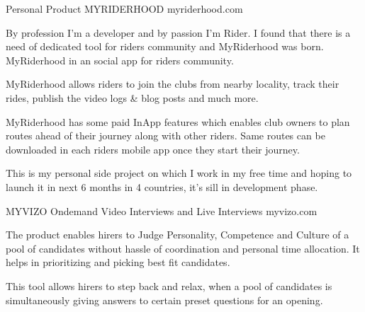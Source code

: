 

\begin{cventries}

  \cventry
    {Personal Product} %
    {MYRIDERHOOD} %
    {myriderhood.com} %
    { } %
    {
      \begin{cvitems} %
        \item {By profession I'm a developer and by passion I'm Rider. I found that there is a need of dedicated tool for riders community and MyRiderhood was born. MyRiderhood in an social app for riders community.}
	 \item {MyRiderhood allows riders to join the clubs from nearby locality, track their rides, publish the video logs \& blog posts and much more. }
	  \item {MyRiderhood has some paid InApp features which enables club owners to plan routes ahead of their journey along with other riders. Same routes can be downloaded in each riders mobile app once they start their journey.}
	   \item {This is my personal side project on which I work in my free time and hoping to launch it in next 6 months in 4 countries, it's sill in development phase. }
        \\
      \end{cvitems}
    }
  \cventry
    {MYVIZO} %
    {Ondemand Video Interviews and Live Interviews} %
    {myvizo.com} %
    { } %
    {
      \begin{cvitems} %
        \item {The product enables hirers to Judge Personality, Competence and Culture of a pool of candidates without hassle of coordination and personal time allocation. It helps in prioritizing and picking best fit candidates.}
        \item {This tool allows hirers to step back and relax, when a pool of candidates is simultaneously giving answers to certain preset questions for an opening.}

\end{cvitems}}
\end{cventries}
